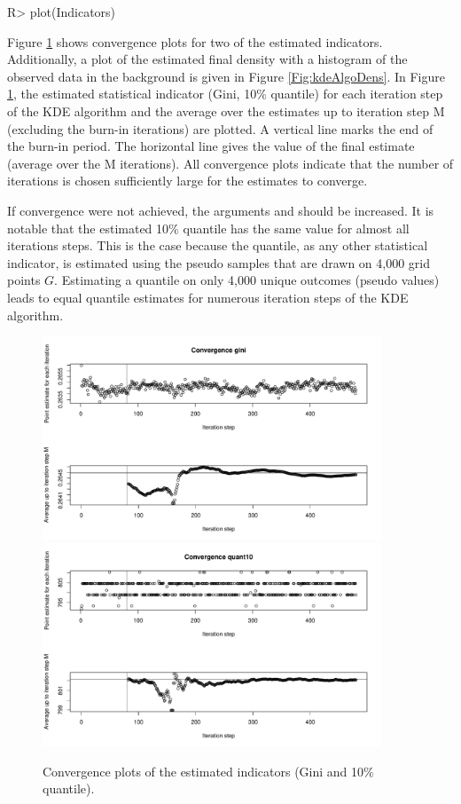 \begin{example}
R> plot(Indicators)
\end{example}


Figure \ref{Fig:kdeAlgoConv} shows convergence plots for two of the estimated indicators. Additionally, a plot of the estimated final density with a histogram of the observed data in the background is given in Figure \ref{Fig:kdeAlgoDens}. In Figure \ref{Fig:kdeAlgoConv}, the estimated statistical indicator (Gini, 10\% quantile)  for each iteration step of the KDE algorithm and the average over the estimates up to iteration step M (excluding the burn-in iterations) are plotted. A vertical line marks the end of the burn-in period. The horizontal line gives the value of the final estimate (average over the M iterations). All convergence plots indicate that the number of iterations is chosen sufficiently large for the estimates to converge. 

If convergence were not achieved, the arguments  and  should be increased. It is notable that the estimated 10\% quantile has the same value for almost all iterations steps. This is the case because the quantile, as any other statistical indicator, is estimated using the pseudo samples that are drawn on 4,000 grid points $G$. Estimating a quantile on only 4,000 unique outcomes (pseudo values) leads to equal quantile estimates for numerous iteration steps of the KDE algorithm.


\begin{figure}[ht]
  \centering
    \includegraphics[width=0.9\textwidth]{Gini.pdf}
     \includegraphics[width=0.9\textwidth]{quant10.pdf}
     \caption{Convergence plots of the estimated indicators (Gini and 10\% quantile).}
     \label{Fig:kdeAlgoConv}
\end{figure}

